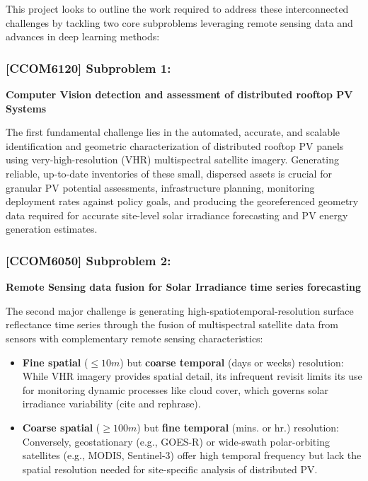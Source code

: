 \begin{multicols}{2}
This project looks to outline the work required to address these interconnected challenges by tackling two core subproblems leveraging remote sensing data and advances in deep learning methods:

\subsubsection{[CCOM6120] Subproblem 1:}
    \textbf{Computer Vision detection and assessment of distributed rooftop PV Systems} 

    The first fundamental challenge lies in the automated, accurate, and scalable identification and geometric characterization of distributed rooftop PV panels using very-high-resolution (VHR) multispectral satellite imagery. 
    Generating reliable, up-to-date inventories of these small, dispersed assets is crucial for granular PV potential assessments\cite{Pueblas_workflow_rooftop_PV_assessment_sat_img_2023}\cite{Jiang_rooftop_pv_assessment_2022}, infrastructure planning, 
    monitoring deployment rates against policy goals\cite{de-Hoog_sota_survey_2020}, and producing the georeferenced geometry data required for accurate site-level solar irradiance forecasting and PV energy generation estimates\cite{Bansal_ssl_nowcasting_2022}.
    \vfill\null
    \columnbreak
    
\subsubsection{[CCOM6050] Subproblem 2:} 
    \textbf{Remote Sensing data fusion for Solar Irradiance time series forecasting} 

    The second major challenge is generating high-spatiotemporal-resolution surface reflectance time series through the fusion of multispectral satellite data from sensors with complementary remote sensing characteristics: 
    \begin{itemize}
        \item \textbf{Fine spatial} ($\le10m$) but \textbf{coarse temporal} (days or weeks) resolution: \\
        While VHR imagery provides spatial detail, its infrequent revisit limits its use for monitoring dynamic processes like cloud cover, which governs solar irradiance variability (cite and rephrase). 
        \item \textbf{Coarse spatial} ($\ge100m$) but \textbf{fine temporal} (mins. or hr.) resolution: \\
        Conversely, geostationary (e.g., GOES-R) or wide-swath polar-orbiting satellites (e.g., MODIS, Sentinel-3) offer high temporal frequency but lack the spatial resolution needed for site-specific analysis of distributed PV. 
    \end{itemize}


\end{multicols}
